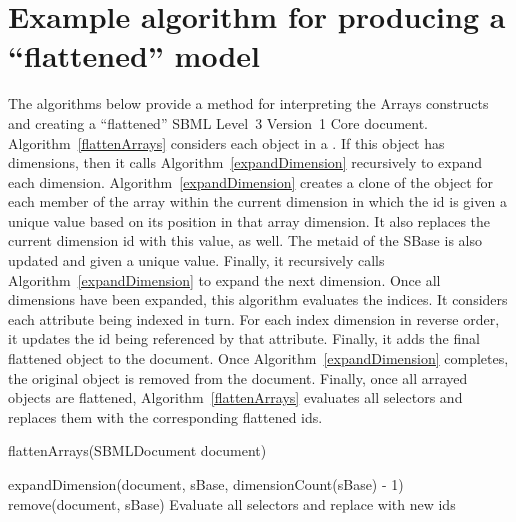 


\section{Example algorithm for producing a ``flattened'' model}
\label{flatten}
The algorithms below provide a method for interpreting the Arrays
constructs and creating a ``flattened'' SBML Level~3 Version~1 Core
document.  Algorithm~\ref{flattenArrays} considers each \SBase object
in a \Model.  If this object has dimensions, then it calls
Algorithm~\ref{expandDimension} recursively to expand each dimension.
Algorithm~\ref{expandDimension} creates a clone of the object for each
member of the array within the current dimension in which the id is
given a unique value based on its position in that array dimension.
It also replaces the current dimension id with this value, as
well. The metaid of the SBase is also updated and given a unique value.  Finally, it recursively calls Algorithm~\ref{expandDimension} to expand the next dimension.  Once all dimensions have been expanded, this algorithm evaluates the indices.  It considers each attribute being indexed in turn.  For each index dimension in reverse order, it updates the id being referenced by that attribute.  Finally, it adds the final flattened object to the document.  Once Algorithm~\ref{expandDimension} completes, the original object is removed from the document.  Finally, once all arrayed objects are flattened, Algorithm~\ref{flattenArrays} evaluates all selectors and replaces them with the corresponding flattened ids.

\begin{algorithm}[ht]
\label{flattenArrays}
  \caption{flattenArrays(SBMLDocument document)}
{
        {
          expandDimension(document, sBase, dimensionCount(sBase) - 1)\;
          remove(document, sBase)\;
        }
}
Evaluate all selectors and replace with new ids\;
\end{algorithm}

